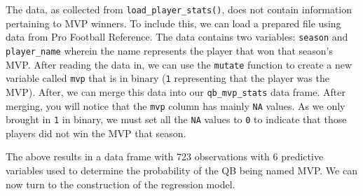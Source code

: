 \documentclass[
  letterpaper,
]{krantz}
\newenvironment{Shaded}{\begin{snugshade}}{\end{snugshade}}
\newcommand{\AttributeTok}[1]{\textcolor[rgb]{0.40,0.45,0.13}{#1}}
\newcommand{\DecValTok}[1]{\textcolor[rgb]{0.68,0.00,0.00}{#1}}
\newcommand{\FunctionTok}[1]{\textcolor[rgb]{0.28,0.35,0.67}{#1}}
\newcommand{\NormalTok}[1]{\textcolor[rgb]{0.00,0.23,0.31}{#1}}
\newcommand{\OtherTok}[1]{\textcolor[rgb]{0.00,0.23,0.31}{#1}}
\newcommand{\SpecialCharTok}[1]{\textcolor[rgb]{0.37,0.37,0.37}{#1}}
\newcommand{\StringTok}[1]{\textcolor[rgb]{0.13,0.47,0.30}{#1}}
\begin{document}
The data, as collected from \texttt{load\_player\_stats()}, does not
contain information pertaining to MVP winners. To include this, we can
load a prepared file using data from Pro Football Reference. The data
contains two variables: \texttt{season} and \texttt{player\_name}
wherein the name represents the player that won that season's MVP. After
reading the data in, we can use the \texttt{mutate} function to create a
new variable called \texttt{mvp} that is in binary (\texttt{1}
representing that the player was the MVP). After, we can merge this data
into our \texttt{qb\_mvp\_stats} data frame. After merging, you will
notice that the \texttt{mvp} column has mainly \texttt{NA} values. As we
only brought in \texttt{1} in binary, we must set all the \texttt{NA}
values to \texttt{0} to indicate that those players did not win the MVP
that season.

\begin{Shaded}
\end{Shaded}

The above results in a data frame with 723 observations with 6
predictive variables used to determine the probability of the QB being
named MVP. We can now turn to the construction of the regression model.
\end{document}
